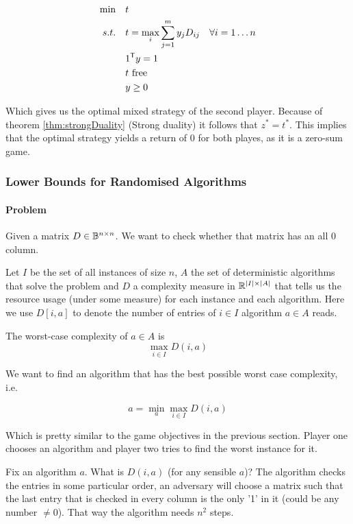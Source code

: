 \begin{pr}
\begin{align*}
\min \quad & t \\
s.t.\quad & t = \max_i \sum^m_{j=1} y_j D_{ij} & \forall i=1\ldots n\\
& {1}^\text{\upshape \sffamily T} y = 1\\
&t \text{ free}\\
&y\geq 0
\end{align*}

Which gives us the optimal mixed strategy of the second player. Because of theorem \ref{thm:strongDuality} (Strong duality) it follows that $z^{*}=t^{*}$. This implies that the optimal strategy yields a return of $0$ for both playes, as it is a zero-sum game.
\end{pr}

\subsubsection{Lower Bounds for Randomised Algorithms}

\paragraph{Problem} Given a matrix $D\in \mathbb{B}^{n\times n}$. We want to check whether that matrix has an all 0 column. 

Let $I$ be the set of all instances of size $n$, $A$ the set of deterministic algorithms that solve the problem and $D$ a complexity measure in $\mathbb{R}^{|I| \times |A|}$ that tells us the resource usage (under some measure) for each instance and each algorithm. Here we use $D[i,a]$ to denote the number of entries of $i\in I$ algorithm $a\in A$ reads.

\begin{Def} The worst-case complexity of $a\in A$ is 
\[\max_{i\in I} D(i,a)\]
\end{Def}

We want to find an algorithm that has the best possible worst case complexity, i.e.

\[a = \min_a \max_{i\in I} D(i,a)\]

Which is pretty similar to the game objectives in the previous section. Player one chooses an algorithm and player two tries to find the worst instance for it.

Fix an algorithm $a$. What is $D(i,a)$ (for any sensible $a$)? The algorithm checks the entries in some particular order, an adversary will choose a matrix such that the last entry that is checked in every column is the only '1' in it (could be any number $\neq 0$). That way the algorithm needs $n^2$ steps.

